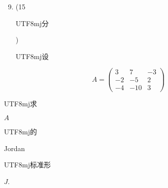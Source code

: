\documentclass[10pt]{article}
\begin{document}
\begin{enumerate}
  \setcounter{enumi}{8}
  \item (15 \begin{CJK}{UTF8}{mj}分\end{CJK}) \begin{CJK}{UTF8}{mj}设\end{CJK}
\end{enumerate}
$$
A=\left(\begin{array}{ccc}
3 & 7 & -3 \\
-2 & -5 & 2 \\
-4 & -10 & 3
\end{array}\right)
$$
\begin{CJK}{UTF8}{mj}求\end{CJK} $A$ \begin{CJK}{UTF8}{mj}的\end{CJK} Jordan \begin{CJK}{UTF8}{mj}标准形\end{CJK} $J$.
\end{document}
